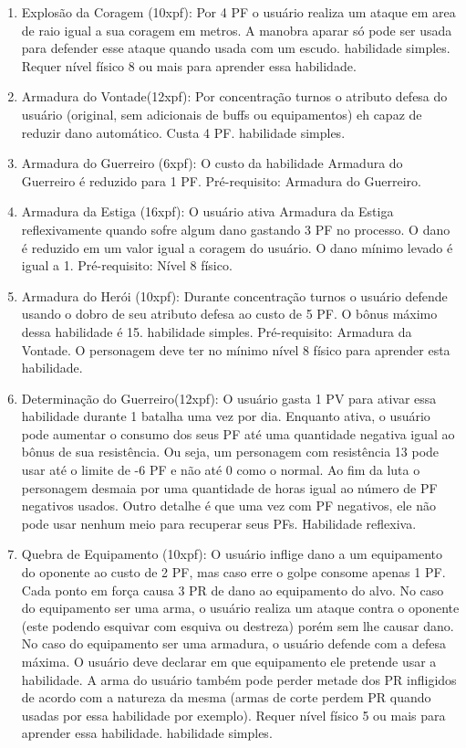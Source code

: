 \begin{enumerate}
	\item Explosão da Coragem (10xpf): Por 4 PF o usuário realiza um ataque em area de raio igual a sua coragem em metros. A manobra aparar só pode ser usada para defender esse ataque quando usada com um escudo. habilidade simples. Requer nível físico 8 ou mais para aprender essa habilidade.

	\item Armadura do Vontade(12xpf): Por concentração turnos o atributo defesa do usuário (original, sem adicionais de buffs ou equipamentos) eh capaz de reduzir dano automático. Custa 4 PF. habilidade simples.

	\item Armadura do Guerreiro (6xpf): O custo da habilidade Armadura do Guerreiro é reduzido para 1 PF. Pré-requisito: Armadura do Guerreiro. 

	\item Armadura da Estiga (16xpf): O usuário ativa Armadura da Estiga reflexivamente quando sofre algum dano gastando 3 PF no processo. O dano é reduzido em um valor igual a coragem do usuário. O dano mínimo levado é igual a 1. Pré-requisito: Nível 8 físico. 

	\item Armadura do Herói (10xpf): Durante concentração turnos o usuário defende usando o dobro de seu atributo defesa ao custo de 5 PF. O bônus máximo dessa habilidade é 15. habilidade simples. Pré-requisito: Armadura da Vontade. O personagem deve ter no mínimo nível 8 físico para aprender esta habilidade.

	\item Determinação do Guerreiro(12xpf): O usuário gasta 1 PV para ativar essa habilidade durante 1 batalha uma vez por dia. Enquanto ativa, o usuário pode aumentar o consumo dos seus PF até uma quantidade negativa igual ao bônus de sua resistência. Ou seja, um personagem com resistência 13 pode usar até o limite de -6 PF e não até 0 como o normal. Ao fim da luta o personagem desmaia por uma quantidade de horas igual ao número de PF negativos usados. Outro detalhe é que uma vez com PF negativos, ele não pode usar nenhum meio para recuperar seus PFs. Habilidade reflexiva.

	\item Quebra de Equipamento (10xpf): O usuário inflige dano a um equipamento do oponente ao custo de 2 PF, mas caso erre o golpe consome apenas 1 PF. Cada ponto em força causa 3 PR de dano ao equipamento do alvo. No caso do equipamento ser uma arma, o usuário realiza um ataque contra o oponente (este podendo esquivar com esquiva ou destreza) porém sem lhe causar dano. No caso do equipamento ser uma armadura, o usuário defende com a defesa máxima. O usuário deve declarar em que equipamento ele pretende usar a habilidade.  A arma do usuário também pode perder metade dos PR infligidos de acordo com a natureza da mesma (armas de corte perdem PR quando usadas por essa habilidade por exemplo). Requer nível físico 5 ou mais para aprender essa habilidade. habilidade simples.


\end{enumerate}
